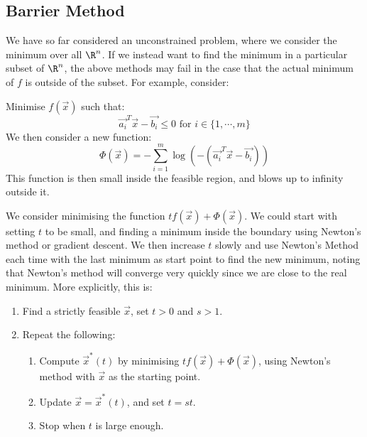 \documentclass[../Main.tex]{subfiles}
\begin{document}
\subsection{Barrier Method}
We have so far considered an unconstrained problem, where we consider the minimum over all $\R^n$. If we instead want to find the minimum in a particular subset of $\R^n$, the above methods may fail in the case that the actual minimum of $f$ is outside of the subset. For example, consider:

Minimise $f(\vec{x})$ such that:
\begin{equation*}
    \vec{a_i}^T \vec{x} - \vec{b_i} \leq 0 \text{ for } i \in \{1, \cdots, m\}
\end{equation*}
We then consider a new function:
\begin{equation*}
    \Phi(\vec{x}) = -\sum_{i=1}^m \log\left(-\left(\vec{a_i}^T \vec{x} - \vec{b_i}\right)\right)
\end{equation*}
This function is then small inside the feasible region, and blows up to infinity outside it.

We consider minimising the function $tf(\vec{x}) + \Phi(\vec{x})$. We could start with setting $t$ to be small, and finding a minimum inside the boundary using Newton's method or gradient descent. We then increase $t$ slowly and use Newton's Method each time with the last minimum as start point to find the new minimum, noting that Newton's method will converge very quickly since we are close to the real minimum. More explicitly, this is:
\begin{enumerate}
    \item Find a strictly feasible $\vec{x}$, set $t > 0$ and $s > 1$.
    \item Repeat the following:
    \begin{enumerate}
        \item Compute $\vec{x}^*(t)$ by minimising $tf(\vec{x}) + \Phi(\vec{x})$, using Newton's method with $\vec{x}$ as the starting point.
        \item Update $\vec{x} = \vec{x}^*(t)$, and set $t = st$.
        \item Stop when $t$ is large enough.
    \end{enumerate}
\end{enumerate}
\end{document}
